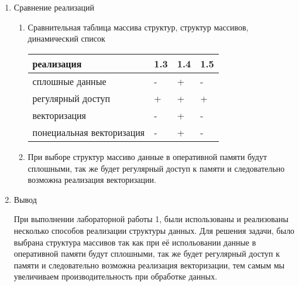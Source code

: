 \documentclass[a4paper,12pt]{extreport}
\begin{document}
\chapter{}

\begin{enumerate}
     
\item Сравнение реализаций
            \begin{enumerate}
                \item Сравнительная таблица массива структур, структур массивов, динамический список
                
                \begin{tabular}{ | l | l | l | l | }
                \hline
                    реализация & 1.3 & 1.4 & 1.5 \\ \hline
                    сплошные данные & - & + & -  \\
                    регулярный доступ & + & + & + \\
                    векторизация & - & + & - \\
                    понециальная векторизация & - & + & - \\
                \hline
                \end{tabular}
                \item При выборе структур массиво данные в оперативной памяти будут сплошными, так же будет регулярный доступ к памяти и следовательно возможна реализация векторизации. 
            \end{enumerate}
            \item Вывод
            
            При выполнении лабораторной работы 1, были использованы и реализованы несколько способов реализации структуры данных. Для решения задачи, было выбрана структура массивов так как при её испольовании данные в оперативной памяти будут сплошными, так же будет регулярный доступ к памяти и следовательно возможна реализация векторизации, тем самым мы увеличиваем производительность при обработке данных.
\end{enumerate}
\end{document}

